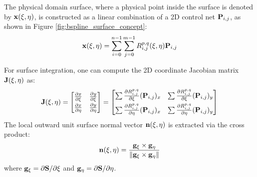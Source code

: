 The physical domain surface, where a physical point inside the surface is denoted by $\mathbf{x}(\xi, \eta)$, is constructed as a linear combination of a 2D control net $\mathbf{P}_{i,j}$, as shown in Figure \ref{fig:bspline_surface_concept}:
\begin{equation}
    \mathbf{x}(\xi, \eta) = \sum_{i=0}^{n-1} \sum_{j=0}^{m-1} R_{i,j}^{p,q}(\xi, \eta) \mathbf{P}_{i,j}
\end{equation}

For surface integration, one can compute the 2D coordinate Jacobian matrix $\mathbf{J}(\xi, \eta)$ as:
\begin{equation}
    \mathbf{J}(\xi, \eta) = \begin{bmatrix} \frac{\partial x}{\partial \xi} & \frac{\partial y}{\partial \xi} \\[0.3em] \frac{\partial x}{\partial \eta} & \frac{\partial y}{\partial \eta} \end{bmatrix} = \begin{bmatrix} \sum \frac{\partial R_{i,j}^{p,q}}{\partial \xi} (\mathbf{P}_{i,j})_x & \sum \frac{\partial R_{i,j}^{p,q}}{\partial \xi} (\mathbf{P}_{i,j})_y \\[0.5em] \sum \frac{\partial R_{i,j}^{p,q}}{\partial \eta} (\mathbf{P}_{i,j})_x & \sum \frac{\partial R_{i,j}^{p,q}}{\partial \eta} (\mathbf{P}_{i,j})_y \end{bmatrix}
\end{equation}
The local outward unit surface normal vector $\mathbf{n}(\xi, \eta)$ is extracted via the cross product:
\begin{equation}
    \mathbf{n}(\xi, \eta) = \frac{\mathbf{g}_{\xi} \times \mathbf{g}_{\eta}}{\|\mathbf{g}_{\xi} \times \mathbf{g}_{\eta}\|}
\end{equation}
where $\mathbf{g}_{\xi} = \partial \mathbf{S}/\partial \xi$ and $\mathbf{g}_{\eta} = \partial \mathbf{S}/\partial \eta$.

